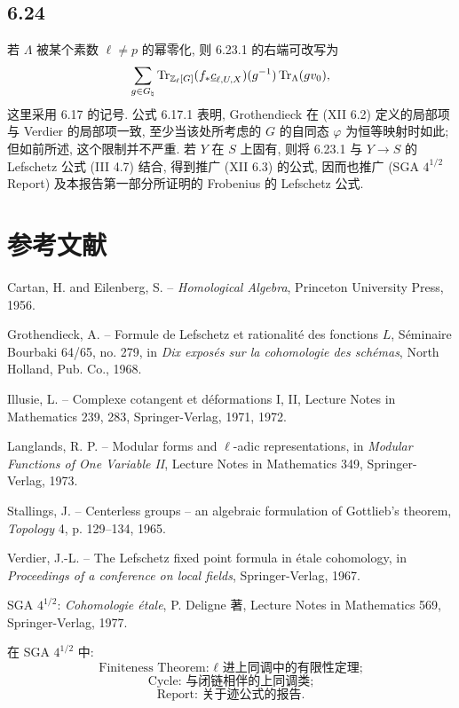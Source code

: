\subsection*{6.24}
若 $\Lambda$ 被某个素数 $\ell\ne p$ 的幂零化, 则 6.23.1 的右端可改写为
\[
\sum_{g\in G_{\natural}}
\operatorname{Tr}_{\mathbb Z_{\ell}[G]}(f_*\underline c_{\ell,U,X})(g^{-1})
\operatorname{Tr}_{\Lambda}(gv_0),
\]
这里采用 6.17 的记号. 公式 6.17.1 表明, Grothendieck 在 (XII 6.2) 定义的局部项与 Verdier 的局部项一致, 至少当该处所考虑的 $G$ 的自同态 $\varphi$ 为恒等映射时如此; 但如前所述, 这个限制并不严重. 若 $Y$ 在 $S$ 上固有, 则将 6.23.1 与 $Y\to S$ 的 Lefschetz 公式 (III 4.7) 结合, 得到推广 (XII 6.3) 的公式, 因而也推广 (SGA $4^{1/2}$ Report) 及本报告第一部分所证明的 Frobenius 的 Lefschetz 公式.

\section*{参考文献}

\begin{enumerate}[label={[\arabic*]}]
\item Cartan, H. and Eilenberg, S. -- \textit{Homological Algebra}, Princeton University Press, 1956.
\item Grothendieck, A. -- Formule de Lefschetz et rationalité des fonctions $L$, Séminaire Bourbaki 64/65, no. 279, in \textit{Dix exposés sur la cohomologie des schémas}, North Holland, Pub. Co., 1968.
\item Illusie, L. -- Complexe cotangent et déformations I, II, Lecture Notes in Mathematics 239, 283, Springer-Verlag, 1971, 1972.
\item Langlands, R. P. -- Modular forms and $\ell$-adic representations, in \textit{Modular Functions of One Variable II}, Lecture Notes in Mathematics 349, Springer-Verlag, 1973.
\item Stallings, J. -- Centerless groups -- an algebraic formulation of Gottlieb's theorem, \textit{Topology} 4, p. 129--134, 1965.
\item Verdier, J.-L. -- The Lefschetz fixed point formula in étale cohomology, in \textit{Proceedings of a conference on local fields}, Springer-Verlag, 1967.
\end{enumerate}

SGA $4^{1/2}$: \textit{Cohomologie étale}, P. Deligne 著, Lecture Notes in Mathematics 569, Springer-Verlag, 1977.

在 SGA $4^{1/2}$ 中:
\[
\text{Finiteness Theorem: }\ell\text{ 进上同调中的有限性定理;}
\]
\[
\text{Cycle: 与闭链相伴的上同调类;}
\]
\[
\text{Report: 关于迹公式的报告.}
\]

